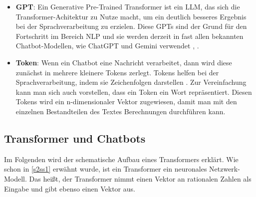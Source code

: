 \begin{itemize}
		\item \textbf{GPT}: Ein Generative Pre-Trained Transformer ist ein LLM, das sich die Transformer-Achitektur 
		zu Nutze macht, um ein deutlich besseres Ergebnis bei der Sprachverarbeitung zu erzielen. Diese GPTs sind
		der Grund für den Fortschritt im Bereich NLP und sie werden derzeit in fast allen bekannten Chatbot-Modellen, 
		wie ChatGPT und Gemini verwendet \cite[S. 2]{gemini2024}, \cite[S. 1]{openAI2024}.  
		
		\item \textbf{Token}: Wenn ein Chatbot eine Nachricht verarbeitet, dann wird diese zunächst in mehrere kleinere 
		Tokens zerlegt. Tokens helfen bei der Sprachverarbeitung, indem sie Zeichenfolgen darstellen \cite{mielke2021}.  
		Zur Vereinfachung kann man sich auch vorstellen, dass ein Token ein Wort repräsentiert. Diesen Tokens wird ein
		n-dimensionaler Vektor zugewiesen, damit man mit den einzelnen Bestandteilen des Textes Berechnungen durchführen kann.    
	\end{itemize}	
	\clearpage
	
	
	\subsection{Transformer und Chatbots}\label{s2ss2}
	Im Folgenden wird der schematische Aufbau eines Transformers erklärt. Wie schon in \ref{s2ss1} erwähnt wurde, 
	ist ein Transformer ein neuronales Netzwerk-Modell. Das heißt, der Transformer nimmt einen Vektor an rationalen 
	Zahlen als Eingabe und gibt ebenso einen Vektor aus.      	
	
